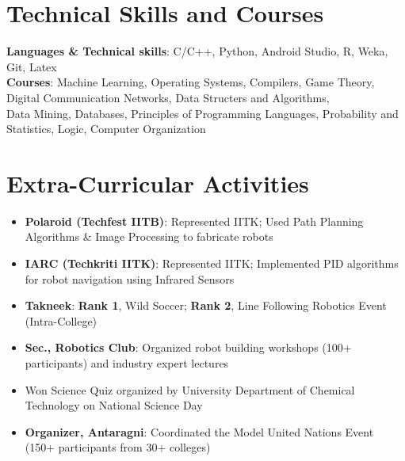 \documentclass[a4paper]{article} %
\newcommand{\bulletspace}{0.7cm}
\begin{document}
\section{Technical Skills and Courses}
    {\small
       \textbf{\-\hspace{0.3cm}Languages \& Technical skills}: C/C++, Python, Android Studio, R, Weka, Git, Latex\\
       \textbf{\-\hspace{0.3cm}Courses}: Machine Learning, Operating Systems, Compilers, Game Theory, Digital Communication Networks, Data Structers and Algorithms,\\ \-\hspace{1.5cm} Data Mining, Databases, Principles of Programming Languages, 
       Probability and Statistics, Logic, Computer Organization  
    }

\vspace{-0.4cm}
\section{Extra-Curricular Activities}
 \begin{itemize}[itemsep = -0.8mm,leftmargin=\bulletspace{}]
        \item \textbf{Polaroid (Techfest IITB)}: Represented IITK; Used Path Planning Algorithms \& Image Processing to fabricate robots 
        \item \textbf{IARC (Techkriti IITK)}: Represented IITK; Implemented PID algorithms for robot navigation using Infrared Sensors
        \item \textbf{Takneek}: \textbf{Rank 1}, Wild Soccer; \textbf{Rank 2}, Line Following Robotics Event (Intra-College)
        \item \textbf{Sec., Robotics Club}: Organized robot building workshops (100+ participants) and industry expert lectures
        \item Won Science Quiz organized by University Department of Chemical Technology on National Science Day 
         \item \textbf{Organizer, Antaragni}: Coordinated the Model United Nations Event (150+ participants from 30+ colleges)
         \end{itemize}
\end{document}
